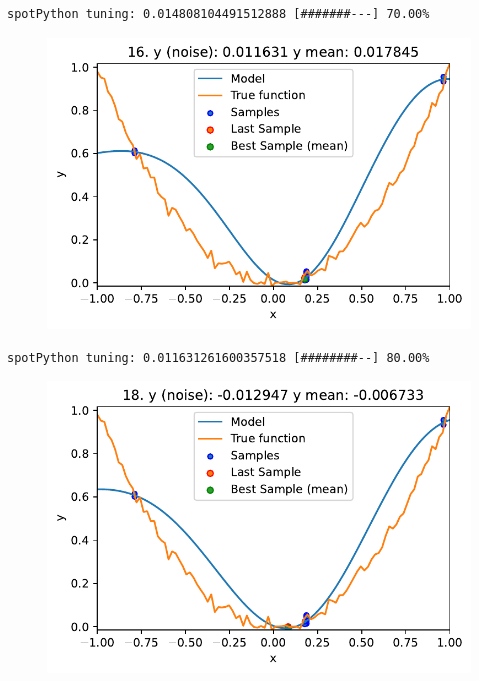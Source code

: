 \documentclass[
  letterpaper,
  DIV=11,
  numbers=noendperiod]{scrreprt}
\begin{document}
\begin{verbatim}
spotPython tuning: 0.014808104491512888 [#######---] 70.00% 
\end{verbatim}

\begin{figure}[H]

{\centering \includegraphics{08_spot_noisy_files/figure-pdf/cell-6-output-10.pdf}

}

\end{figure}

\begin{verbatim}
spotPython tuning: 0.011631261600357518 [########--] 80.00% 
\end{verbatim}

\begin{figure}[H]

{\centering \includegraphics{08_spot_noisy_files/figure-pdf/cell-6-output-12.pdf}

}

\end{figure}
\end{document}
